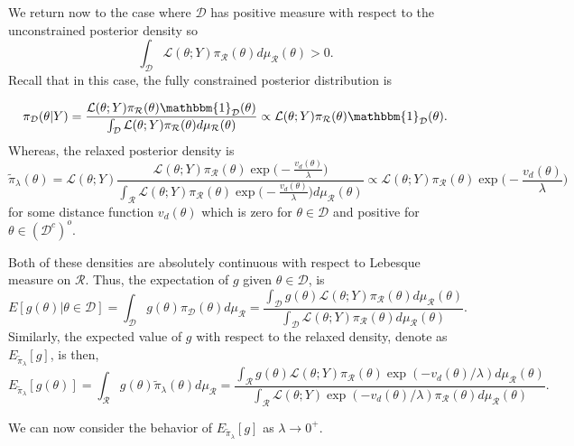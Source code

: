 \documentclass[10pt,fleqn]{article}
\DeclareMathOperator{\1}{\mathbbm{1}}
\begin{document}
{We return now to the case where $\mathcal{D}$ has positive measure with respect to the unconstrained posterior density so $$\int_\mathcal{D} \mathcal{L}(\theta; Y) \pi_\mathcal{R}(\theta)d\mu_\mathcal{R}(\theta) >0.$$ Recall that in this case, the fully constrained posterior distribution is

$$\pi_\mathcal{D}(\theta|Y) = \frac{\mathcal{L}(\theta; Y) \pi_\mathcal{R}(\theta)\mathbbm{1}_\mathcal{D}(\theta)}{\int_\mathcal{D} \mathcal{L}(\theta; Y) \pi_\mathcal{R}(\theta)d\mu_\mathcal{R}(\theta)}\propto \mathcal{L}(\theta; Y) \pi_\mathcal{R}(\theta)\mathbbm{1}_\mathcal{D}(\theta). $$  Whereas, the relaxed posterior density is
$$\tilde{\pi}_\lambda(\theta) = \mathcal{L}(\theta; Y) \frac{\mathcal{L}(\theta; Y)\pi_\mathcal{R}(\theta)\exp\big(-\frac{v_d(\theta)}{\lambda}\big)}{\int_{\mathcal{R}}\mathcal{L}(\theta; Y) \pi_\mathcal{R}(\theta)\exp\big(-\frac{v_d(\theta)}{\lambda}\big) d\mu_\mathcal{R}(\theta)} \propto \mathcal{L}(\theta; Y) \pi_\mathcal{R}(\theta)\exp\big(-\frac{v_d(\theta)}{\lambda}\big)$$
for some distance function $v_d(\theta)$ which is zero for $\theta \in \mathcal{D}$ and positive for $\theta \in (\mathcal{D}^c)^o.$  

Both of these densities are absolutely continuous with respect to Lebesque measure on $\mathcal{R}$.  Thus, the expectation of $g$ given $\theta\in\mathcal{D}$, is
\begin{equation}
\label{EQ:Expectation_Positive_Measure_Constraint}
E[g(\theta)|\theta\in\mathcal{D}] = \int_\mathcal{D} g(\theta)\pi_\mathcal{D}(\theta)d\mu_\mathcal{R} = \frac{\int_\mathcal{D} g(\theta)\mathcal{L}(\theta; Y) \pi_\mathcal{R}(\theta)d\mu_\mathcal{R}(\theta)}{\int_\mathcal{D} \mathcal{L}(\theta; Y) \pi_\mathcal{R}(\theta)d\mu_\mathcal{R}(\theta)}.
\end{equation} 
Similarly, the expected value of $g$ with respect to the relaxed density, denote as $E_{\tilde{\pi}_\lambda}[g]$, is then,
\begin{equation}
\label{EQ:Expectation_Positive_Measure_Relaxed}
E_{\tilde{\pi}_\lambda}[g(\theta)] = \int_\mathcal{R} g(\theta)\tilde{\pi}_\lambda(\theta)d\mu_\mathcal{R} = \frac{\int_\mathcal{R} g(\theta)\mathcal{L}(\theta; Y) \pi_\mathcal{R}(\theta) \exp(-v_d(\theta)/\lambda)d\mu_\mathcal{R}(\theta)}{\int_\mathcal{R} \mathcal{L}(\theta; Y)\exp(-v_d(\theta)/\lambda) \pi_\mathcal{R}(\theta)d\mu_\mathcal{R}(\theta)}.\end{equation}

We can now consider the behavior of $E_{\tilde{\pi}_\lambda}[g]$ as $\lambda \to 0^+.$

}
\end{document}
